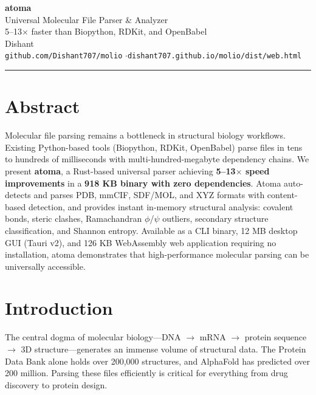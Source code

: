 \documentclass[11pt,a4paper]{article}
\begin{document}
\begin{center}
{\LARGE\bfseries atoma}\\[8pt]
{\Large Universal Molecular File Parser \& Analyzer}\\[6pt]
{\large 5--13$\times$ faster than Biopython, RDKit, and OpenBabel}\\[12pt]
{\normalsize Dishant}\\[2pt]
{\footnotesize\texttt{github.com/Dishant707/molio} \quad$\cdot$\quad \texttt{dishant707.github.io/molio/dist/web.html}}
\end{center}
\vspace{4pt}
\begin{center}
\rule{0.5\textwidth}{0.4pt}
\end{center}
\vspace{12pt}

\section*{Abstract}

Molecular file parsing remains a bottleneck in structural biology workflows. Existing Python-based tools (Biopython, RDKit, OpenBabel) parse files in tens to hundreds of milliseconds with multi-hundred-megabyte dependency chains. We present \textbf{atoma}, a Rust-based universal parser achieving \textbf{5--13$\times$ speed improvements} in a \textbf{918 KB binary with zero dependencies}. Atoma auto-detects and parses PDB, mmCIF, SDF/MOL, and XYZ formats with content-based detection, and provides instant in-memory structural analysis: covalent bonds, steric clashes, Ramachandran $\phi$/$\psi$ outliers, secondary structure classification, and Shannon entropy. Available as a CLI binary, 12 MB desktop GUI (Tauri v2), and 126 KB WebAssembly web application requiring no installation, atoma demonstrates that high-performance molecular parsing can be universally accessible.

\vspace{16pt}

\section{Introduction}

The central dogma of molecular biology---DNA $\rightarrow$ mRNA $\rightarrow$ protein sequence $\rightarrow$ 3D structure---generates an immense volume of structural data. The Protein Data Bank alone holds over 200,000 structures, and AlphaFold has predicted over 200 million. Parsing these files efficiently is critical for everything from drug discovery to protein design.
\end{document}
